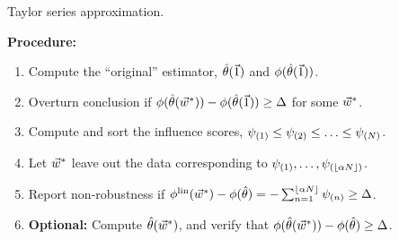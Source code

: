 

\begin{frame}{Taylor series approximation.}

\textbf{Procedure:}

\begin{enumerate}
    \item<2-> Compute the ``original'' estimator, $\hat{\theta}(\vec{1})$ and
    $\phi(\hat{\theta}(\vec{1}))$.
    \item<3-> Overturn conclusion if
        $\phi(\hat{\theta}(\vec{w}^*)) - \phi(\hat{\theta}(\vec{1})) \ge \Delta$
        for some $\vec{w}^*$.
    \item<4-> Compute and sort the influence scores,
        $\psi_{(1)} \le \psi_{(2)} \le \ldots \le \psi_{(N)}$.
    \item<5-> Let $\vec{w}^*$ leave out the data corresponding to
    $\psi_{(1)},  \ldots , \psi_{(\lfloor \alpha N \rfloor)}$.
    \item<6-> Report non-robustness if
        $ \phi^{\mathrm{lin}}(\vec{w}^*) - \phi(\hat{\theta})  =
            - \sum_{n=1}^{\lfloor \alpha N \rfloor} \psi_{(n)} \ge \Delta$.
    \item<7-> \textbf{Optional: } Compute $\hat{\theta}(\vec{w}^*)$, and verify
    that $\phi(\hat{\theta}(\vec{w}^*)) - \phi(\hat{\theta}) \ge \Delta$.
\end{enumerate}

\end{frame}
